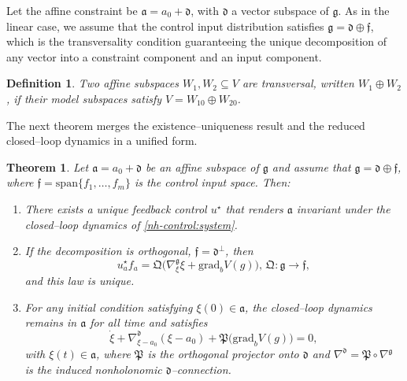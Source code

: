 \documentclass[letterpaper, 10 pt, conference]{ieeeconf}
\newtheorem{theorem}{Theorem}
\newtheorem{definition}{Definition}
\newcommand{\g}{\mathfrak{g}}
\begin{document}
Let the affine constraint be $\mathfrak a = a_0 + \mathfrak d$, with 
$\mathfrak d$ a vector subspace of $\g$.  As in the linear case, we assume that the control input distribution satisfies $\g = \mathfrak d \oplus \mathfrak f$, which is the transversality condition guaranteeing the unique decomposition of any vector into a constraint component and an input component.

\begin{definition}
Two affine subspaces $W_1,W_2\subseteq V$ are \emph{transversal}, written
$W_1\oplus W_2$, if their model subspaces satisfy
$V = W_{10} \oplus W_{20}$.
\end{definition}

The next theorem merges the existence–uniqueness result and the reduced closed–loop dynamics in a unified form.

\begin{theorem}
\label{thm:affine-unified}
Let $\mathfrak a = a_0 + \mathfrak d$ be an affine subspace of $\g$ and
assume that $\g=\mathfrak d\oplus\mathfrak f$, where 
$\mathfrak f = \mathrm{span}\{f_1,\dots,f_m\}$ is the control input space. Then:

\begin{enumerate}
\item There exists a unique feedback control $u^\star$ that renders
$\mathfrak a$ invariant under the closed--loop dynamics of 
\eqref{nh-control:system}.  

\item  If the decomposition is \emph{orthogonal},
$\mathfrak f = \mathfrak d^\perp$, then
\begin{equation}\label{eq:affine-feedback}
u^\star_a f_a
= 
\mathfrak Q\Big(
    \nabla^{\g}_{\xi}\xi
  + \text{grad}_{b} V(g)
\Big),
\, \mathfrak Q:\g\to\mathfrak f,
\end{equation}
and this law is unique.

\item For any initial condition satisfying $\xi(0)\in\mathfrak a$, the closed--loop
dynamics remains in $\mathfrak a$ for all time and satisfies
\begin{equation}\label{eq:affine-reduced}
\dot{\xi}
+ \nabla^{\mathfrak d}_{\xi-a_0}(\xi-a_0)
+ \mathfrak{P}\!\Big(
    \text{grad}_{b} V(g)
  \Big)
= 0,
\end{equation}
with $\xi(t)\in\mathfrak a$, where $\mathfrak P$ is the orthogonal projector onto $\mathfrak d$ and
$\nabla^{\mathfrak d} = \mathfrak P\circ\nabla^{\g}$ is the induced
nonholonomic $\mathfrak d$–connection.
\end{enumerate}
\end{theorem}
\end{document}
